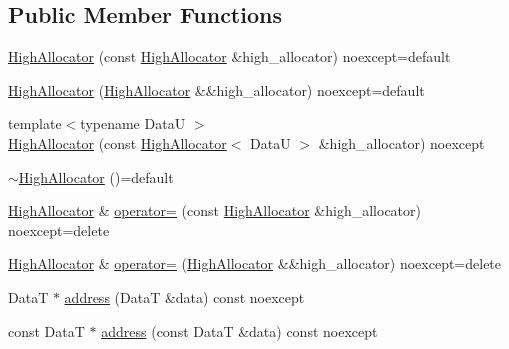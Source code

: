 \subsection*{Public Member Functions}
\begin{DoxyCompactItemize}
\item 
\hyperlink{structmage_1_1_double_ended_memory_stack_1_1_high_allocator_aaad727b10738064cffcb555252df5cfd}{High\+Allocator} (const \hyperlink{structmage_1_1_double_ended_memory_stack_1_1_high_allocator}{High\+Allocator} \&high\+\_\+allocator) noexcept=default
\item 
\hyperlink{structmage_1_1_double_ended_memory_stack_1_1_high_allocator_a9b036295101c4f271f30236b3cae9a1b}{High\+Allocator} (\hyperlink{structmage_1_1_double_ended_memory_stack_1_1_high_allocator}{High\+Allocator} \&\&high\+\_\+allocator) noexcept=default
\item 
{\footnotesize template$<$typename DataU $>$ }\\\hyperlink{structmage_1_1_double_ended_memory_stack_1_1_high_allocator_a6210e1fbac98efbf26ddf6cbe8fe6be8}{High\+Allocator} (const \hyperlink{structmage_1_1_double_ended_memory_stack_1_1_high_allocator}{High\+Allocator}$<$ DataU $>$ \&high\+\_\+allocator) noexcept
\item 
\hyperlink{structmage_1_1_double_ended_memory_stack_1_1_high_allocator_ae329a13c09bf81bddcf708239bbe26da}{$\sim$\+High\+Allocator} ()=default
\item 
\hyperlink{structmage_1_1_double_ended_memory_stack_1_1_high_allocator}{High\+Allocator} \& \hyperlink{structmage_1_1_double_ended_memory_stack_1_1_high_allocator_a7b0319849971e5d3dba9074184560500}{operator=} (const \hyperlink{structmage_1_1_double_ended_memory_stack_1_1_high_allocator}{High\+Allocator} \&high\+\_\+allocator) noexcept=delete
\item 
\hyperlink{structmage_1_1_double_ended_memory_stack_1_1_high_allocator}{High\+Allocator} \& \hyperlink{structmage_1_1_double_ended_memory_stack_1_1_high_allocator_a3c668fe7ff9ae1efd3743461253e7923}{operator=} (\hyperlink{structmage_1_1_double_ended_memory_stack_1_1_high_allocator}{High\+Allocator} \&\&high\+\_\+allocator) noexcept=delete
\item 
DataT $\ast$ \hyperlink{structmage_1_1_double_ended_memory_stack_1_1_high_allocator_a5d2532bb8ebb4919271a312e3a872579}{address} (DataT \&data) const noexcept
\item 
const DataT $\ast$ \hyperlink{structmage_1_1_double_ended_memory_stack_1_1_high_allocator_ab88c9b0e885ee1cc1aaaad2194ae7910}{address} (const DataT \&data) const noexcept

\end{DoxyCompactItemize}
